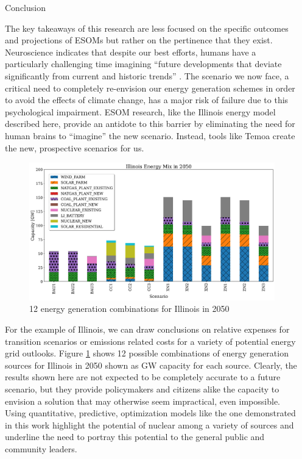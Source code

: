 \documentclass[final]{beamer}
\newlength{\sepwid}
\newlength{\onecolwid}
\newlength{\threecolwid}
\begin{document}
\begin{frame}[t]
\begin{columns}[t,totalwidth=\threecolwid]
\begin{column}{\sepwid}\end{column} %

\begin{column}{\onecolwid} %

\begin{block}{Conclusion}
\vspace{0.7em}

The key takeaways of this research are less focused on the specific outcomes and projections of ESOMs but rather on the pertinence that they exist. Neuroscience indicates that despite our best efforts, humans have a particularly challenging time imagining ``future developments that deviate significantly from current and historic trends'' \cite{psych}. The scenario we now face, a critical need to completely re-envision our energy generation schemes in order to avoid the effects of climate change, has a major risk of failure due to this psychological impairment. ESOM research, like the Illinois energy model described here, provide an antidote to this barrier by eliminating the need for human brains to ``imagine'' the new scenario. Instead, tools like Temoa create the new, prospective scenarios for us.

\begin{figure}[h!]
	\label{fig:energy_mix_2050}
	\includegraphics[width=0.9\linewidth]{energy_mix_2050.jpg}
	\caption{12 energy generation combinations for Illinois in 2050 \cite{dotson}}
\end{figure}

For the example of Illinois, we can draw conclusions on relative expenses for transition scenarios or emissions related costs for a variety of potential energy grid outlooks. Figure \ref{fig:energy_mix_2050} shows 12 possible combinations of energy generation sources for Illinois in 2050 shown as GW capacity for each source. Clearly, the results shown here are not expected to be completely accurate to a future scenario, but they provide policymakers and citizens alike the capacity to envision a solution that may otherwise seem impractical, even impossible. Using quantitative, predictive, optimization models like the one demonstrated in this work highlight the potential of nuclear among a variety of sources and underline the need to portray this potential to the general public and community leaders.


\end{block}
\end{column}
\end{columns}
\end{frame}
\end{document}
